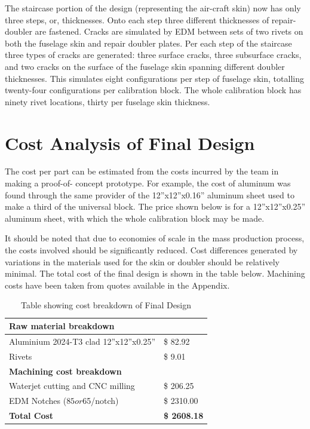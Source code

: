 \documentclass[12pt]{article}
\begin{document}
The staircase portion of the design (representing the air-craft skin) now has only three steps, or, thicknesses. Onto each step three different thicknesses of repair-doubler are fastened. Cracks are simulated by EDM between sets of two rivets on both the fuselage skin and repair doubler plates. Per each step of the staircase three types of cracks are generated: three surface cracks, three subsurface cracks, and two cracks on the surface of the fuselage skin spanning different doubler thicknesses. This simulates eight configurations per step of fuselage skin, totalling twenty-four configurations per calibration block. The whole calibration block has ninety rivet locations, thirty per fuselage skin thickness. 

\clearpage
\section{Cost Analysis of Final Design}

The cost per part can be estimated from the costs incurred by the team in making a proof-of-
concept prototype. For example, the cost of aluminum was found through the same provider of the 12''x12''x0.16'' aluminum sheet used to make a third of the universal block. The price shown below is for a 12''x12''x0.25'' aluminum sheet, with which the whole calibration block may be made.

It should be noted that due to economies of scale in the mass production process, the costs involved should be significantly reduced. Cost differences generated by  variations in the materials used for the skin or doubler should be relatively minimal. The  total cost of the final design is shown in the table below. Machining costs have been taken from quotes available in the Appendix. 

\vspace{10mm}

\begin{table}[H]
\centering
\begin{tabular}{@{}ll@{}}
\toprule
\rowcolor[HTML]{C0C0C0} 
\textbf{Raw material breakdown}   &                     \\ \midrule
Aluminium 2024-T3 clad 12''x12''x0.25''    & \$ 82.92            \\
Rivets                            & \$ 9.01             \\ \midrule
\rowcolor[HTML]{C0C0C0} 
\textbf{Machining cost breakdown} & \textbf{}           \\ \midrule
Waterjet cutting and CNC milling  & \$ 206.25           \\
EDM Notches ($85 or $65/notch)    & \$ 2310.00          \\ \midrule
\rowcolor[HTML]{C0C0C0} 
\textbf{Total Cost}               & \textbf{\$ 2608.18} \\ \bottomrule
\end{tabular}
\caption{Table showing cost breakdown of Final Design}
\end{table}
\end{document}
